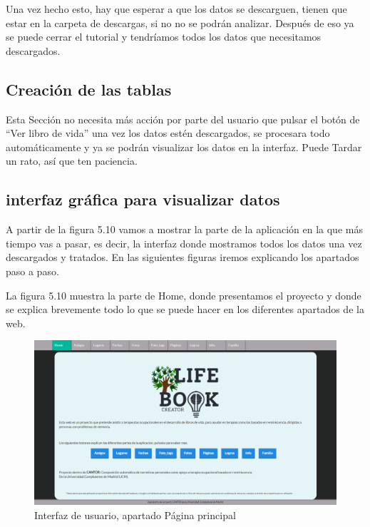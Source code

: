 Una vez hecho esto, hay que esperar a que los datos se descarguen, tienen que estar en la carpeta de descargas, si no no se podrán analizar. Después de eso ya se puede cerrar el tutorial y tendríamos todos los datos que necesitamos descargados.

\subsection{Creación de las tablas}

Esta Sección no necesita más acción por parte del usuario que pulsar el botón de ``Ver libro de vida'' una vez los datos estén descargados, se procesara todo automáticamente y ya se podrán visualizar los datos en la interfaz. Puede Tardar un rato, así que ten paciencia.

\subsection{interfaz gráfica para visualizar datos}

A partir de la figura 5.10 vamos a mostrar la parte de la aplicación en la que más tiempo vas a pasar, es decir, la interfaz donde mostramos todos los datos una vez descargados y tratados. En las siguientes figuras iremos explicando los apartados paso a paso.

\color{blue}
La figura 5.10 muestra la parte de Home, donde presentamos el proyecto y donde se explica brevemente todo lo que se puede hacer en los diferentes apartados de la web.
\begin{figure}
	\begin{center}
		\includegraphics[scale=0.3]{Imagenes/Fuentes/InterfazHome.png} \caption{Interfaz de usuario, apartado Página principal}
		\label{WebAplication1}
	\end{center}
\end{figure}

